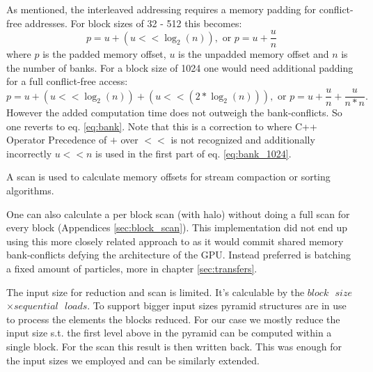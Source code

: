\documentclass[m,times]{cgMA}
\begin{document}
As mentioned, the interleaved addressing requires a memory padding for conflict-free addresses. For block sizes of 32 - 512 this becomes:
\begin{equation}\label{eq:bank}
  p = u + (u << \log_2(n)), \text{ or }   p = u + \frac{u}{n}
\end{equation}
where $p$ is the padded memory offset, $u$ is the unpadded memory offset and $n$ is the number of banks.
For a block size of 1024 one would need additional padding for a full conflict-free access:
\begin{equation}\label{eq:bank_1024}
  p = u + (u << \log_2(n)) + (u << (2 * \log_2(n))), \text{ or }   p = u + \frac{u}{n} + \frac{u}{n*n}.
\end{equation}
However the added computation time does not outweigh the bank-conflicts. So one reverts to eq. \ref{eq:bank}. Note that this is a correction to \cite{NVIDIA:SCAN} where C++ Operator Precedence of $+$ over $<<$ is not recognized and additionally incorrectly $ u << n$ is used in the first part of eq. \ref{eq:bank_1024}.

A scan is used to calculate memory offsets for stream compaction or sorting algorithms.

One can also calculate a per block scan (with halo) without doing a full scan for every block (Appendices \ref{sec:block_scan}). This implementation did not end up using this more closely related approach to \cite{NVIDIA:NNSEARCH} as it would commit shared memory bank-conflicts defying the architecture of the GPU. Instead preferred is batching a fixed amount of particles, more in chapter \ref{sec:transfers}.


The input size for reduction and scan is limited. It's calculable by the $block\text{ }size$ $ \times sequential\text{ }loads$. To support bigger input sizes pyramid structures are in use to process the elements the blocks reduced. For our case we mostly reduce the input size s.t. the first level above in the pyramid can be computed within a single block. For the scan this result is then written back. This was enough for the input sizes we employed and can be similarly extended.
\end{document}
